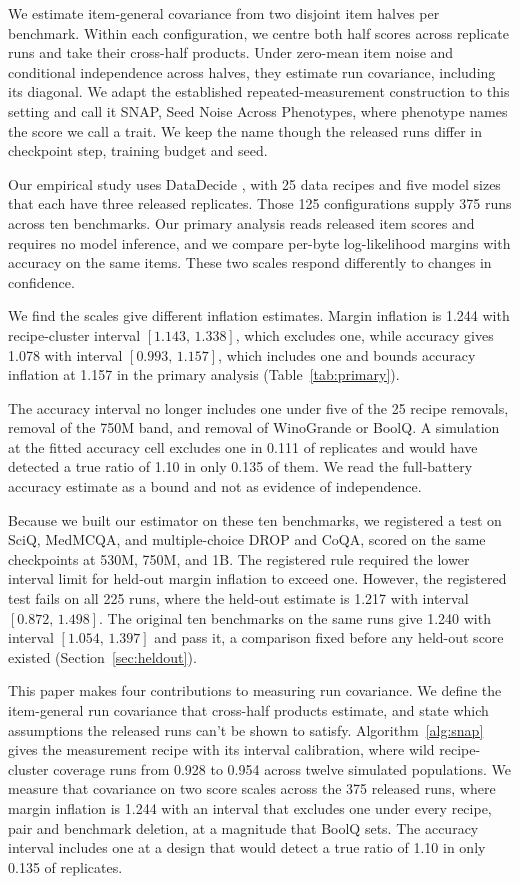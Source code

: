 \documentclass{article}
\newcommand{\ci}[2]{\ensuremath{[#1,\,#2]}}
\begin{document}
We estimate item-general covariance from two disjoint item halves per benchmark. Within each configuration, we centre both half scores across replicate runs and take their cross-half products. Under zero-mean item noise and conditional independence across halves, they estimate run covariance, including its diagonal. We adapt the established repeated-measurement construction to this setting and call it SNAP, Seed Noise Across Phenotypes, where phenotype names the score we call a trait. We keep the name though the released runs differ in checkpoint step, training budget and seed.

Our empirical study uses DataDecide \citep{magnusson2025}, with 25 data recipes and five model sizes that each have three released replicates. Those 125 configurations supply 375 runs across ten benchmarks. Our primary analysis reads released item scores and requires no model inference, and we compare per-byte log-likelihood margins with accuracy on the same items. These two scales respond differently to changes in confidence.

We find the scales give different inflation estimates. Margin inflation is 1.244 with recipe-cluster interval \ci{1.143}{1.338}, which excludes one, while accuracy gives 1.078 with interval \ci{0.993}{1.157}, which includes one and bounds accuracy inflation at 1.157 in the primary analysis (Table~\ref{tab:primary}).

The accuracy interval no longer includes one under five of the 25 recipe removals, removal of the 750M band, and removal of WinoGrande or BoolQ. A simulation at the fitted accuracy cell excludes one in 0.111 of replicates and would have detected a true ratio of 1.10 in only 0.135 of them. We read the full-battery accuracy estimate as a bound and not as evidence of independence.

Because we built our estimator on these ten benchmarks, we registered a test on SciQ, MedMCQA, and multiple-choice DROP and CoQA, scored on the same checkpoints at 530M, 750M, and 1B. The registered rule required the lower interval limit for held-out margin inflation to exceed one. However, the registered test fails on all 225 runs, where the held-out estimate is 1.217 with interval \ci{0.872}{1.498}. The original ten benchmarks on the same runs give 1.240 with interval \ci{1.054}{1.397} and pass it, a comparison fixed before any held-out score existed (Section~\ref{sec:heldout}).

This paper makes four contributions to measuring run covariance. We define the item-general run covariance that cross-half products estimate, and state which assumptions the released runs can't be shown to satisfy. Algorithm~\ref{alg:snap} gives the measurement recipe with its interval calibration, where wild recipe-cluster coverage runs from 0.928 to 0.954 across twelve simulated populations. We measure that covariance on two score scales across the 375 released runs, where margin inflation is 1.244 with an interval that excludes one under every recipe, pair and benchmark deletion, at a magnitude that BoolQ sets. The accuracy interval includes one at a design that would detect a true ratio of 1.10 in only 0.135 of replicates.
\end{document}
